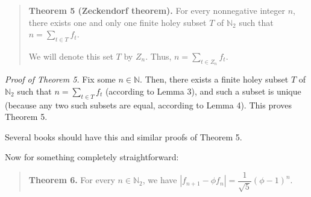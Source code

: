 \documentclass[12pt,final,notitlepage,onecolumn]{article}%
\begin{document}
\begin{quote}
\textbf{Theorem 5 (Zeckendorf theorem).} For every nonnegative integer $n$,
there exists one and only one finite holey subset $T$ of $\mathbb{N}_{2}$ such
that $n=\sum\limits_{t\in T}f_{t}$.

We will denote this set $T$ by $Z_{n}$. Thus, $n=\sum\limits_{t\in Z_{n}}%
f_{t}$.
\end{quote}

\textit{Proof of Theorem 5.} Fix some $n\in\mathbb{N}$. Then, there exists a
finite holey subset $T$ of $\mathbb{N}_{2}$ such that $n=\sum\limits_{t\in
T}f_{t}$ (according to Lemma 3), and such a subset is unique (because any two
such subsets are equal, according to Lemma 4). This proves Theorem 5.

Several books should have this and similar proofs of Theorem 5.

Now for something completely straightforward:

\begin{quote}
\textbf{Theorem 6.} For every $n\in\mathbb{N}_{2}$, we have $\left\vert
f_{n+1}-\phi f_{n}\right\vert =\dfrac{1}{\sqrt{5}}\left(  \phi-1\right)  ^{n}$.
\end{quote}
\end{document}

